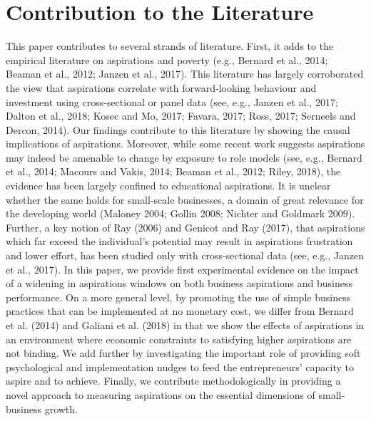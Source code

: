 \documentclass[11.5pt]{article}
\begin{document}
\thispagestyle{empty}

\pagebreak

\onehalfspacing

\setcounter{page}{1}


\section{Contribution to the Literature} \label{sec:cont}

This paper contributes to several strands of literature. First, it adds to the empirical literature on aspirations and poverty (e.g., Bernard et al., 2014; Beaman et al., 2012; Janzen et al., 2017). This literature has largely corroborated the view that aspirations correlate with forward-looking behaviour and investment using cross-sectional or panel data (see, e.g., Janzen et al., 2017; Dalton et al., 2018; Kosec and Mo, 2017; Favara, 2017; Ross, 2017; Serneels and Dercon, 2014). Our findings contribute to this literature by showing the causal implications of aspirations. Moreover, while some recent work suggests aspirations may indeed be amenable to change by exposure to role models (see, e.g., Bernard et al., 2014; Macours and Vakis, 2014; Beaman et al., 2012; Riley, 2018), the evidence has been largely confined to educational aspirations. It is unclear whether the same holds for small-scale businesses, a domain of great relevance for the developing world (Maloney 2004; Gollin 2008; Nichter and Goldmark 2009). Further, a key notion of Ray (2006) and Genicot and Ray (2017), that aspirations which far exceed the individual's potential may result in aspirations frustration and lower effort, has been studied only with cross-sectional data (see, e.g., Janzen et al., 2017). In this paper, we provide first experimental evidence on the impact of a widening in aspirations windows on both business aspirations and business performance. On a more general level, by promoting the use of simple business practices that can be implemented at no monetary cost, we differ from Bernard et al. (2014) and Galiani et al. (2018) in that we show the effects of aspirations in an environment where economic constraints to satisfying higher aspirations are not binding. We add further by investigating the important role of providing soft psychological and implementation nudges to feed the entrepreneurs' capacity to aspire and to achieve. %
Finally, we contribute methodologically in providing a novel approach to measuring aspirations on the essential dimensions of small-business growth.
\end{document}
